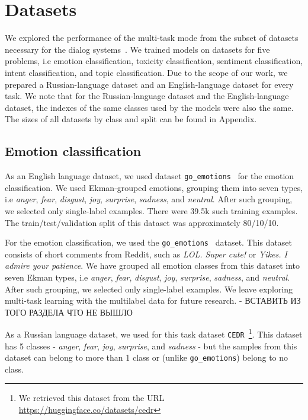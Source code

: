 \section{Datasets}


We explored the performance of the multi-task mode from the subset of datasets necessary for the dialog systems~\cite{wochat,lrec}. We trained models on datasets for five problems, i.e emotion classification, toxicity classification, sentiment classification, intent classification, and topic classification. Due to the scope of our work, we prepared a Russian-language dataset and an English-language dataset for every task. We note that for the Russian-language dataset and the English-language dataset, the indexes of the same classes used by the models were also the same. The sizes of all datasets by class and split can be found in Appendix. 

\subsection{Emotion classification }

As an English language dataset, we used dataset \texttt{go\_emotions}~\cite{emotions} for the emotion classification. We used Ekman-grouped emotions, grouping them into seven types, i.e \textit{anger}, \textit{fear}, \textit{disgust}, \textit{joy}, \textit{surprise}, \textit{sadness}, and \textit{neutral}. After such grouping, we selected only single-label examples. There were 39.5k such training examples. The train/test/validation split of this dataset was approximately 80/10/10.


For the emotion classification, we used the \texttt{go\_emotions}~\cite{emotions} dataset. This dataset consists of short comments from Reddit, such as \textit{LOL. Super cute!} or \textit{Yikes. I admire your patience}. We have grouped all emotion classes from this dataset into seven Ekman types, i.e \textit{anger}, \textit{fear}, \textit{disgust}, \textit{joy}, \textit{surprise}, \textit{sadness}, and \textit{neutral}. After such grouping, we selected only single-label examples. We leave exploring multi-task learning with the multilabel data for future research. - ВСТАВИТЬ ИЗ ТОГО РАЗДЕЛА ЧТО НЕ ВЫШЛО

As a Russian language dataset, we used for this task dataset \texttt{CEDR}~\cite{ru_emotions}\footnote{We retrieved this dataset from the URL \url{https://huggingface.co/datasets/cedr}}. This dataset has 5 classes - \textit{anger}, \textit{fear}, \textit{joy}, \textit{surprise}, and \textit{sadness} - but the samples from this dataset can belong to more than 1 class or (unlike \texttt{go\_emotions}) belong to no class. 

